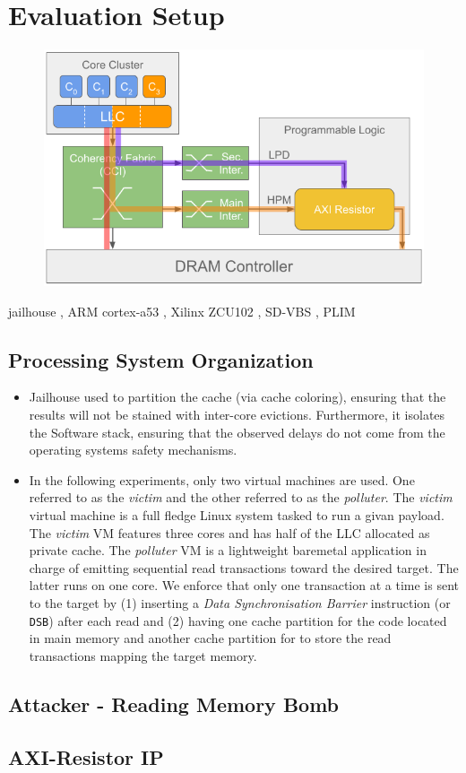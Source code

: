 \section{Evaluation Setup}
    \begin{figure}
        \centering
        \includegraphics[scale=0.35]{images/Evaluation_setup.png}
        \caption{}
        \label{}
    \end{figure}
    jailhouse \cite{jailhouse}, ARM cortex-a53 \cite{ARM-cortex-A53}, Xilinx ZCU102 \cite{Xilinx-ULTRASCALE-TRM}, SD-VBS \cite{SD-VBS}, PLIM \cite{PLIM20}

    \subsection{Processing System Organization}
        \begin{itemize}
            \item Jailhouse used to partition the cache (via cache coloring), ensuring that the results will not be stained with inter-core evictions. Furthermore, it isolates the Software stack, ensuring that the observed delays do not come from the operating systems safety mechanisms.
            \item In the following experiments, only two virtual machines are used. One referred to as the \emph{victim} and the other referred to as the \emph{polluter}. The \emph{victim} virtual machine is a full fledge Linux system tasked to run a givan payload. The \emph{victim} VM features three cores and has half of the LLC allocated as private cache. The \emph{polluter} VM is a lightweight baremetal application in charge of emitting sequential read transactions toward the desired target. The latter runs on one core. We enforce that only one transaction at a time is sent to the target by (1) inserting a \emph{Data Synchronisation Barrier} instruction (or \texttt{DSB}) after each read and (2) having one cache partition for the code located in main memory and another cache partition for to store the read transactions mapping the target memory.
        \end{itemize}

    \subsection{Attacker - Reading Memory Bomb}
    \subsection{AXI-Resistor IP}
